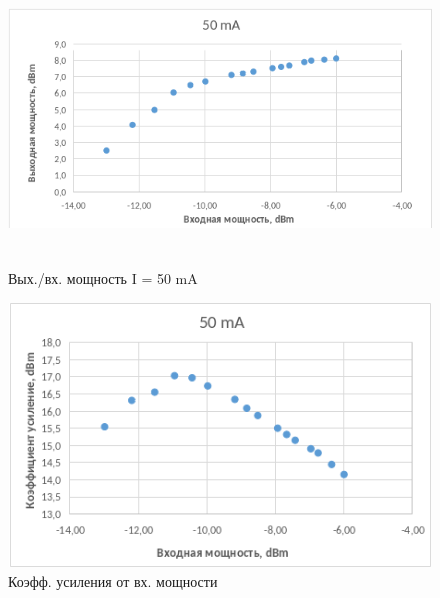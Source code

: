 \documentclass[12pt,a4paper]{article}
\begin{document}
\begin{figure}[h!]
    \begin{center}
    \begin{minipage}[h!]{0.49\linewidth}
    \includegraphics[width = 1\textwidth, height=7cm]{point_4_50.png}
    \caption{Вых./вх. мощность I = 50 mA}
    \label{1}
    \end{minipage}
    \begin{minipage}[h!]{0.49\linewidth}
    \includegraphics[width = 1\textwidth, height=7cm]{point_5_50.png}
    \caption{Коэфф. усиления от вх. мощности}
    \label{2}
    \end{minipage}
    \end{center}
\end{figure}  
\end{document}
